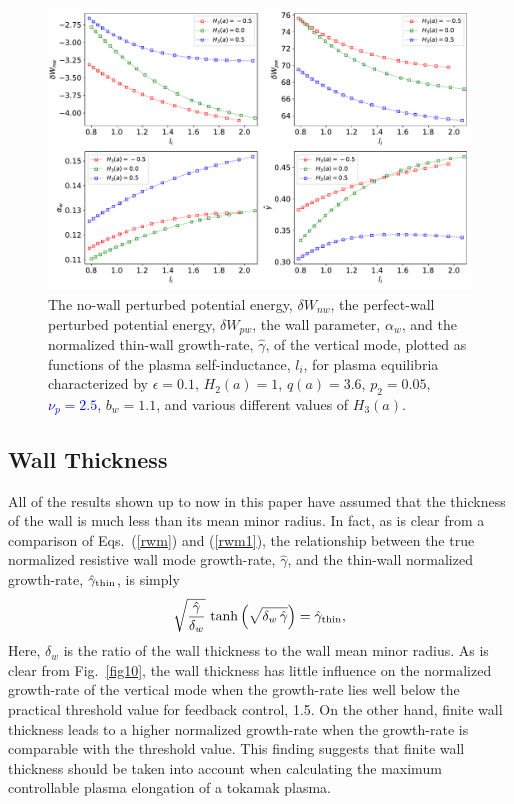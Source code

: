 \documentclass[12pt,prb,aps]{revtex4-1}
\begin{document}
\begin{figure}
\centerline{\includegraphics[width=\textwidth]{Fig7.pdf}}
\caption{The no-wall perturbed potential energy, $\delta W_{nw}$, the perfect-wall perturbed potential energy, $\delta W_{pw}$, the wall
parameter, $\alpha_w$, and the normalized thin-wall growth-rate, $\hat{\gamma}$,  of the vertical mode, plotted as  functions of the
plasma self-inductance, $l_i$, for plasma equilibria characterized by  $\epsilon=0.1$, $H_2(a)=1$,   $q(a)=3.6$, $p_2=0.05$, \textcolor{blue}{$\nu_p=2.5$}, $b_w=1.1$,  and various different values of $H_3(a)$.\label{fig7}}
\end{figure}

\subsection{Wall Thickness}
All of the results shown up to now in this paper have assumed that the thickness of the wall is much less than its mean minor radius. In fact, as
is clear from a comparison of Eqs.~(\ref{rwm}) and (\ref{rwm1}), the relationship between the true normalized resistive wall mode growth-rate, $\hat{\gamma}$, and the
thin-wall normalized growth-rate, $\hat{\gamma}_{\rm thin}$, is simply
\begin{equation}
\sqrt{\frac{\hat{\gamma}}{\delta_w}}\,\tanh\left(\sqrt{\delta_w\,\hat{\gamma}}\right)= \hat{\gamma}_{\rm thin},
\end{equation}
Here, $\delta_w$ is the ratio of the wall thickness to the wall mean minor radius. As is clear from Fig.~\ref{fig10}, the wall thickness has little influence on the
normalized growth-rate of the vertical mode when the growth-rate lies well below the practical threshold value for feedback control, 1.5. On the other
hand, finite wall thickness leads to a higher normalized growth-rate when the growth-rate is comparable with the threshold value. This finding
suggests that finite wall thickness should be taken into account when calculating the maximum controllable plasma elongation of a tokamak plasma. 
\end{document}
